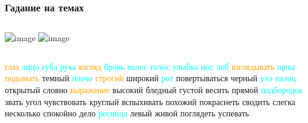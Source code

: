 \documentclass[10pt,svgnames]{beamer}
\begin{document}
\begin{frame}
  \frametitle{Гадание на темах}
  \begin{columns}
    \includegraphics<1>[width=.95\textwidth]{tealeafreading}
    \includegraphics<2>[width=.95\textwidth]{trelawney}
  \end{columns}
\end{frame}

\begin{frame}

\bigskip

  \textcolor<2>{orange}{глаз} \textcolor<3>{cyan}{лицо губа рука} \textcolor<2>{orange}{взгляд} \textcolor<3>{cyan}{бровь волос голос улыбка нос лоб}
  \textcolor<2>{orange}{взглядывать} \textcolor<3>{cyan}{щека} \textcolor<2>{orange}{подымать} темный \textcolor<3>{cyan}{плечо} \textcolor<2>{orange}{строгий} широкий \textcolor<3>{cyan}{рот}
  повертываться черный \textcolor<3>{cyan}{ухо палец} открытый словно \textcolor<2>{orange}{выражение} высокий
  бледный густой весить прямой \textcolor<3>{cyan}{подбородок} звать угол чувствовать
  круглый вспыхивать похожий покраснеть сводить слегка несколько
  спокойно дело \textcolor<3>{cyan}{ресница} левый живой поглядеть успевать  
\end{frame}
\end{document}
